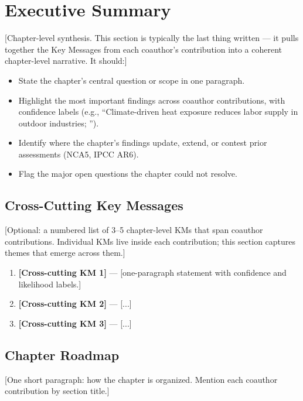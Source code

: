 %

\section*{Executive Summary}

[Chapter-level synthesis. This section is typically the last thing written —
it pulls together the Key Messages from each coauthor's contribution into a
coherent chapter-level narrative. It should:]

\begin{itemize}
  \item State the chapter's central question or scope in one paragraph.
  \item Highlight the most important findings across coauthor contributions, with
        confidence labels (e.g., ``Climate-driven heat exposure reduces labor
        supply in outdoor industries; '').
  \item Identify where the chapter's findings update, extend, or contest prior
        assessments (NCA5, IPCC AR6).
  \item Flag the major open questions the chapter could not resolve.
\end{itemize}

\subsection*{Cross-Cutting Key Messages}

[Optional: a numbered list of 3–5 chapter-level KMs that span coauthor
contributions. Individual KMs live inside each contribution; this section
captures themes that emerge across them.]

\begin{enumerate}
  \item \textbf{[Cross-cutting KM 1]} — [one-paragraph statement with
        confidence and likelihood labels.]  
  \item \textbf{[Cross-cutting KM 2]} — [...] 
  \item \textbf{[Cross-cutting KM 3]} — [...] 
\end{enumerate}

\subsection*{Chapter Roadmap}

[One short paragraph: how the chapter is organized. Mention each coauthor
contribution by section title.]

\newpage
